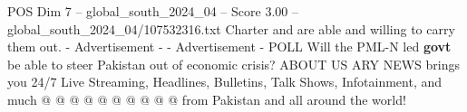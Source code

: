 \begin{textsample}{POS Dim 7 – global\_south\_2024\_04 – Score 3.00 – global\_south\_2024\_04/107532316.txt}
Charter and are able and willing to carry them out. - Advertisement - - Advertisement - POLL Will the PML-N led \textbf{govt} be able to steer Pakistan out of economic crisis?
ABOUT US ARY NEWS brings you 24/7 Live Streaming, Headlines, Bulletins, Talk Shows, Infotainment, and much @ @ @ @ @ @ @ @ @ @ from Pakistan and all around the world!

\end{textsample}
